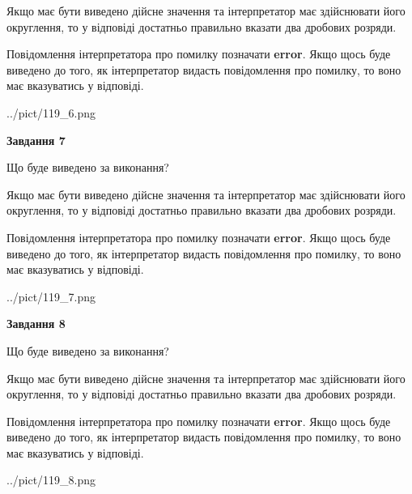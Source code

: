 \documentclass[12pt, ukrainian]{article}
\begin{document}
{\begin {Large}
Якщо має бути виведено дійсне значення та інтерпретатор має здійснювати його округлення, 
то у відповіді достатньо правильно вказати два дробових розряди.

Повідомлення інтерпретатора про помилку позначати \textbf{error}.
Якщо щось буде виведено до того, як інтерпретатор видасть повідомлення про помилку, 
то воно має вказуватись у відповіді. \par

\begin{center}
	{../pict/119_6.png}
\end{center}
\newpage

{\begin {center}\textbf{Завдання 7}\end {center}}\par
Що буде виведено за виконання? \par

Якщо має бути виведено дійсне значення та інтерпретатор має здійснювати його округлення, 
то у відповіді достатньо правильно вказати два дробових розряди.

Повідомлення інтерпретатора про помилку позначати \textbf{error}.
Якщо щось буде виведено до того, як інтерпретатор видасть повідомлення про помилку, 
то воно має вказуватись у відповіді. \par

\begin{center}
	{../pict/119_7.png}
\end{center}
\newpage

{\begin {center}\textbf{Завдання 8}\end {center}}\par
Що буде виведено за виконання? \par

Якщо має бути виведено дійсне значення та інтерпретатор має здійснювати його округлення, 
то у відповіді достатньо правильно вказати два дробових розряди.

Повідомлення інтерпретатора про помилку позначати \textbf{error}.
Якщо щось буде виведено до того, як інтерпретатор видасть повідомлення про помилку, 
то воно має вказуватись у відповіді. \par

\begin{center}
	{../pict/119_8.png}
\end{center}
\newpage


\end{Large}}
\end{document}
